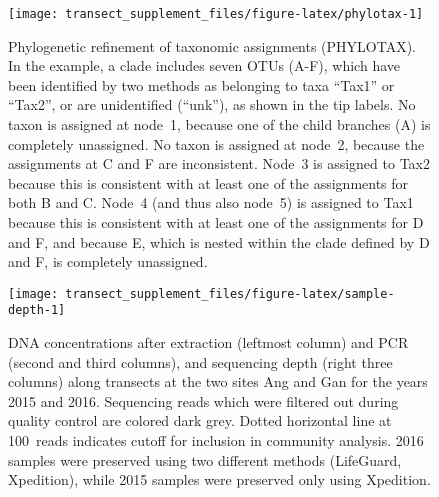 \documentclass[
]{article}
\begin{document}
\begin{figure}

{\centering \texttt{[image: transect\_supplement\_files/figure-latex/phylotax-1]} 

}

\caption[Phylogenetic refinement of taxonomic assignments (PHYLOTAX)]{Phylogenetic refinement of taxonomic assignments (PHYLOTAX). In the example, a clade includes seven OTUs (A-F), which have been identified by two methods as belonging to taxa ``Tax1'' or ``Tax2'', or are unidentified (``unk''), as shown in the tip labels.
No taxon is assigned at node~1, because one of the child branches (A) is completely unassigned.
No taxon is assigned at node~2, because the assignments at C and F are inconsistent.
Node~3 is assigned to Tax2 because this is consistent with at least one of the assignments for both B and C.
Node~4 (and thus also node~5) is assigned to Tax1 because this is consistent with at least one of the assignments for D and F, and because E, which is nested within the clade defined by D and F, is completely unassigned.}\label{fig:phylotax}
\end{figure}








\begin{sidewaysfigure}

{\centering \texttt{[image: transect\_supplement\_files/figure-latex/sample-depth-1]} 

}

\caption[DNA concentrations after extraction and PCR, and sequencing depth along transects at the two sites Ang and Gan for the years 2015 and 2016]{DNA concentrations after extraction (leftmost column) and PCR (second and third columns), and sequencing depth (right three columns) along transects at the two sites Ang and Gan for the years 2015 and 2016.
Sequencing reads which were filtered out during quality control are colored dark grey.
Dotted horizontal line at 100~reads indicates cutoff for inclusion in community analysis.
2016 samples were preserved using two different methods (LifeGuard, Xpedition), while 2015 samples were preserved only using Xpedition.}\label{fig:sample-depth}
\end{sidewaysfigure}
\end{document}
